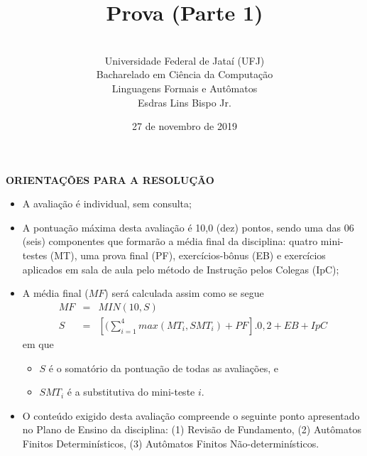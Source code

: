 \documentclass[12pt,a4paper,oneside]{article}
\author{\\Universidade Federal de Jataí (UFJ)\\Bacharelado em Ciência da Computação \\Linguagens Formais e Autômatos \\Esdras Lins Bispo Jr.}
\date{27 de novembro de 2019}
\title{\sc \huge Prova (Parte 1)}
\begin{document}
\maketitle

{\bf ORIENTAÇÕES PARA A RESOLUÇÃO}

\small
 
\begin{itemize}
	\item A avaliação é individual, sem consulta;
	\item A pontuação máxima desta avaliação é 10,0 (dez) pontos, sendo uma das 06 (seis) componentes que formarão a média final da disciplina: quatro mini-testes (MT), uma prova final (PF), exercícios-bônus (EB) e exercícios aplicados em sala de aula pelo método de Instrução pelos Colegas (IpC);
	\item A média final ($MF$) será calculada assim como se segue
	\begin{eqnarray}
		MF & = & MIN(10, S) \nonumber \\
		S & = & [(\sum_{i=1}^{4} max(MT_i, SMT_i ) + PF].0,2  + EB + IpC\nonumber
	\end{eqnarray}
	em que 
	\begin{itemize}
		\item $S$ é o somatório da pontuação de todas as avaliações, e
		\item $SMT_i$ é a substitutiva do mini-teste $i$.
	\end{itemize}
	\item O conteúdo exigido desta avaliação compreende o seguinte ponto apresentado no Plano de Ensino da disciplina: (1) Revisão de Fundamento, (2) Autômatos Finitos Determinísticos, (3) Autômatos Finitos Não-determinísticos.
\end{itemize}

\begin{center}
\end{center}

\newpage
\end{document}
